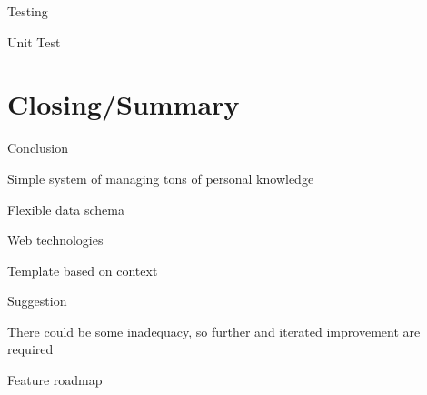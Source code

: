 \documentclass[10pt, compress]{beamer}
\begin{document}

\begin{frame}{Testing}

  Unit Test

\end{frame}


\section{Closing/Summary}


\begin{frame}{Conclusion}

Simple system of managing tons of personal knowledge

Flexible data schema

Web technologies

Template based on context

\end{frame}


\begin{frame}{Suggestion}

There could be some inadequacy, so further and iterated improvement are required

Feature roadmap

\end{frame}



\end{document}
